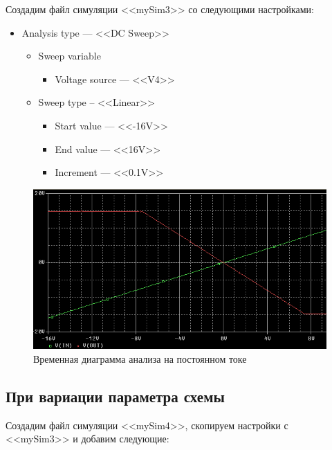 \documentclass[utf8x, 12pt]{G7-32}
\begin{document}
Создадим файл симуляции <<mySim3>> со следующими настройками:

	\begin{itemize}	
		\item Analysis type --- <<DC Sweep>>
		\begin{itemize}	
			\item Sweep variable
			\begin{itemize}	
				\item Voltage source --- <<V4>>
			\end{itemize}
			\item Sweep type -- <<Linear>>
			\begin{itemize}	
				\item Start value --- <<-16V>>
				\item End value --- <<16V>>
 				\item Increment --- <<0.1V>>
			\end{itemize}
		\end{itemize}
	\end{itemize}

\newpage

\begin{figure}[h]
	\begin{center}
		\includegraphics[width=12cm]{img/waveform_2_0}
	\end{center}
	\vspace{-5mm}\caption{Временная диаграмма анализа на постоянном токе}
\end{figure}	


\subsection{При вариации параметра схемы}

Создадим файл симуляции <<mySim4>>, скопируем настройки с <<mySim3>> и добавим следующие:
\end{document}
